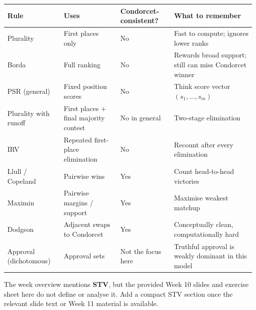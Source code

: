 \begin{center}
\renewcommand{\arraystretch}{1.25}
\begin{tabular}{@{}p{2.1cm}p{2.2cm}p{2.4cm}p{4.1cm}@{}}
\toprule
\textbf{Rule} & \textbf{Uses} & \textbf{Condorcet-consistent?} & \textbf{What to remember} \\
\midrule
Plurality & First places only & No & Fast to compute; ignores lower ranks \\
Borda & Full ranking & No & Rewards broad support; still can miss Condorcet winner \\
PSR (general) & Fixed position scores & No & Think score vector $(s_1,\ldots,s_m)$ \\
Plurality with runoff & First places + final majority contest & No in general & Two-stage elimination \\
IRV & Repeated first-place elimination & No & Recount after every elimination \\
Llull / Copeland & Pairwise wins & Yes & Count head-to-head victories \\
Maximin & Pairwise margins / support & Yes & Maximise weakest matchup \\
Dodgson & Adjacent swaps to Condorcet & Yes & Conceptually clean, computationally hard \\
Approval (dichotomous) & Approval sets & Not the focus here & Truthful approval is weakly dominant in this model \\
\bottomrule
\end{tabular}
\end{center}

\begin{tipbox}
The week overview mentions \textbf{STV}, but the provided Week 10 slides and exercise sheet here do not define or analyse it. \TODO{} Add a compact STV section once the relevant slide text or Week 11 material is available.
\end{tipbox}
